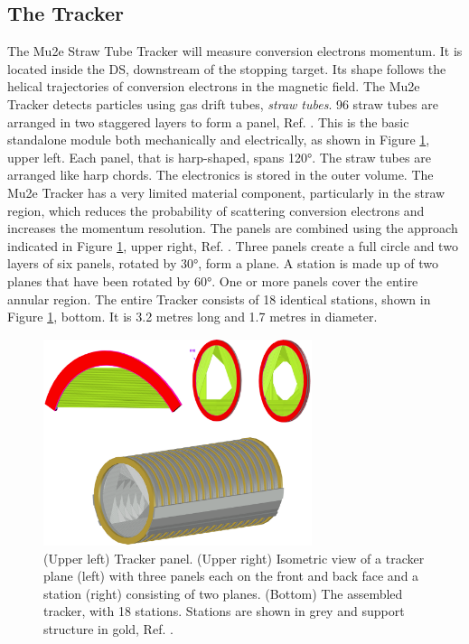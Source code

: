 \subsection{The Tracker}\label{trackersec}
The Mu2e Straw Tube Tracker will measure conversion electrons momentum. It is located inside the DS, downstream of the stopping target. Its shape follows the helical trajectories of conversion electrons in the magnetic field. The Mu2e Tracker detects particles using gas drift tubes, \textit{straw tubes}. 96 straw tubes are arranged in two staggered layers to form a panel, Ref. \cite{bartoszek2015mu2e}. This is the basic standalone module both mechanically and electrically, as shown in Figure \ref{fig:trkpanel}, upper left. Each panel, that is harp-shaped, spans 120°. The straw tubes are arranged like harp chords. The electronics is stored in the outer volume. The Mu2e Tracker has a very limited material component, particularly in the straw region, which reduces the probability of scattering conversion electrons and increases the momentum resolution. The panels are combined using the approach indicated in Figure \ref{fig:trkpanel}, upper right, Ref. \cite{trk}. Three panels create a full circle and two layers of six panels, rotated by 30°, form a plane. A station is made up of two planes that have been rotated by 60°. One or more panels cover the entire annular region. The entire Tracker consists of 18 identical stations, shown in Figure \ref{fig:trkpanel}, bottom. It is 3.2 metres long and 1.7 metres in diameter. 
\begin{figure}[!h]
\centering
\includegraphics[width =0.7\textwidth]{images/chapter2/Screenshot_20240306_222803.png}
\caption{(Upper left) Tracker panel. (Upper right) Isometric view of a tracker plane (left) with three panels each on the front and back face and a station (right) consisting of two planes. (Bottom) The assembled tracker, with 18 stations. Stations are shown in grey and support structure in gold, Ref. \cite{bartoszek2015mu2e}.}
\label{fig:trkpanel}
\end{figure}

